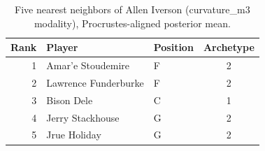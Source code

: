 \begin{table}[htbp]
  \centering\small
  \begin{tabular}{rllc}
    \toprule
    Rank & Player & Position & Archetype \\
    \midrule
    1 & Amar'e Stoudemire & F & 2 \\
    2 & Lawrence Funderburke & F & 2 \\
    3 & Bison Dele & C & 1 \\
    4 & Jerry Stackhouse & G & 2 \\
    5 & Jrue Holiday & G & 2 \\
    \bottomrule
  \end{tabular}
  \caption{Five nearest neighbors of Allen Iverson (curvature_m3 modality), Procrustes-aligned posterior mean.}
  \label{tab:Allen_Iverson_neighbors_curvature_m3}
\end{table}

